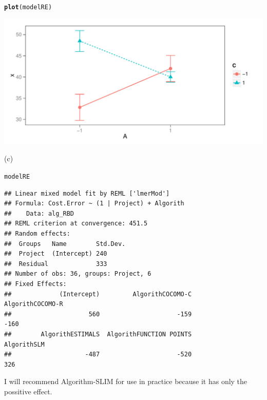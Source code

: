 \documentclass[a4paper]{article}\usepackage{graphicx, color}
\makeatletter
\def\maxwidth{ %
  \ifdim\Gin@nat@width>\linewidth
    \linewidth
  \else
    \Gin@nat@width
  \fi
}
\newcommand{\hlfunctioncall}[1]{\textcolor[rgb]{0.501960784313725,0,0.329411764705882}{\textbf{#1}}}%
\newenvironment{kframe}{%
 \def\at@end@of@kframe{}%
 \ifinner\ifhmode%
  \def\at@end@of@kframe{\end{minipage}}%
  \begin{minipage}{\columnwidth}%
 \fi\fi%
 \def\FrameCommand##1{\hskip\@totalleftmargin \hskip-\fboxsep
 \colorbox{shadecolor}{##1}\hskip-\fboxsep
     \hskip-\linewidth \hskip-\@totalleftmargin \hskip\columnwidth}%
 \MakeFramed {\advance\hsize-\width
   \@totalleftmargin\z@ \linewidth\hsize
   \@setminipage}}%
 {\par\unskip\endMakeFramed%
 \at@end@of@kframe}
\newenvironment{knitrout}{}{} %
\makeatother
\begin{document}
\begin{knitrout}
\color{fgcolor}\begin{kframe}
\begin{alltt}
\hlfunctioncall{plot}(modelRE)
\end{alltt}
\end{kframe}
\includegraphics[width=\maxwidth]{figure/unnamed-chunk-5} 

\end{knitrout}


(c)

\begin{knitrout}
\color{fgcolor}\begin{kframe}
\begin{alltt}
modelRE
\end{alltt}
\begin{verbatim}
## Linear mixed model fit by REML ['lmerMod']
## Formula: Cost.Error ~ (1 | Project) + Algorith 
##    Data: alg_RBD 
## REML criterion at convergence: 451.5 
## Random effects:
##  Groups   Name        Std.Dev.
##  Project  (Intercept) 240     
##  Residual             333     
## Number of obs: 36, groups: Project, 6
## Fixed Effects:
##             (Intercept)         AlgorithCOCOMO-C         AlgorithCOCOMO-R  
##                     560                     -159                     -160  
##        AlgorithESTIMALS  AlgorithFUNCTION POINTS              AlgorithSLM  
##                    -487                     -520                      326
\end{verbatim}
\end{kframe}
\end{knitrout}


I will recommend Algorithm-SLIM for use in practice because it has only the possitive effect.


\vspace{4 mm}
\end{document}
